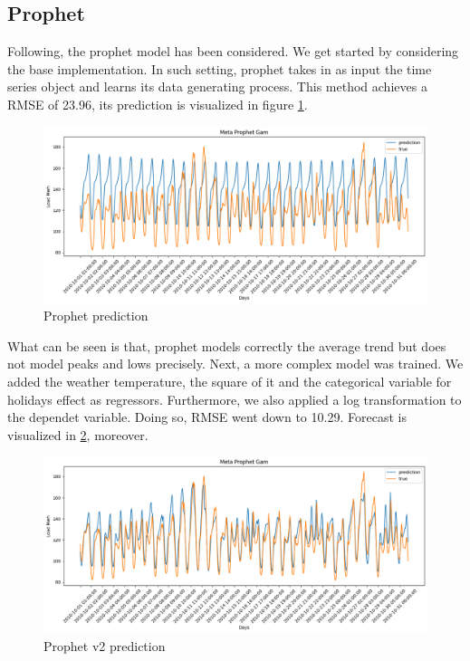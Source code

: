 \subsection{Prophet}
Following, the prophet model has been considered. 
We get started by considering the base implementation. In such setting, prophet takes in as input the time series object and learns its data generating process.
This method achieves a RMSE of 23.96, its prediction is visualized in figure \ref{fig:prophet_price_1}.
\begin{figure}[!h]
    \includegraphics[width=\textwidth]{images/prophet_price_1.png}
    \caption{Prophet prediction}
    \label{fig:prophet_price_1}
\end{figure}
What can be seen is that, prophet models correctly the average trend but does not model peaks and lows precisely. 
Next, a more complex model was trained. We added the weather temperature, the square of it and the categorical variable for holidays effect as regressors. Furthermore, we also applied a log transformation to the dependet variable. Doing so, RMSE went down to 10.29. Forecast is visualized in \ref{fig:prophet_price2}, moreover.
\begin{figure}[!h]
    \includegraphics[width=\textwidth]{images/prophet_price2.png}
    \caption{Prophet v2 prediction}
    \label{fig:prophet_price2}
\end{figure}


